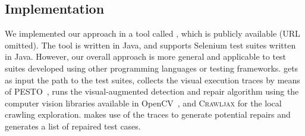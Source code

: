 \subsection{Implementation}\label{sec:implementation}

We implemented our approach in a tool called \tool, which is publicly available (URL omitted). 
The tool is written in Java, and supports Selenium test suites written in Java. However, our overall approach is more general and applicable to test suites developed using other programming languages or testing frameworks. 
\tool gets as input the path to the test suites, collects the visual execution traces by means of \textsc{PESTO}~\cite{2014-Stocco-SCAM}, runs the visual-augmented detection and repair algorithm using the computer vision libraries available in OpenCV~\cite{}, and \textsc{Crawljax} for the local crawling exploration. 
\tool makes use of the traces to generate potential repairs and generates a list of repaired test cases.







